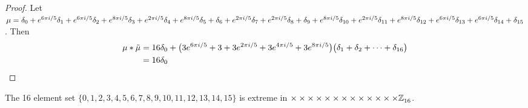  
\begin{proof}
Let  $\mu =  \delta_{0}+e^{6\pi i/5}\delta_{1}+e^{6\pi i/5}\delta_{2}+e^{8\pi i/5}\delta_{3}+e^{2\pi i/5}\delta_{4}+e^{8\pi i/5}\delta_{5}+\delta_{6}+e^{2\pi i/5}\delta_{7}+e^{2\pi i/5}\delta_{8}+\delta_{9}+e^{8\pi i/5}\delta_{10}+e^{2\pi i/5}\delta_{11}+e^{8\pi i/5}\delta_{12}+e^{6\pi i/5}\delta_{13}+e^{6\pi i/5}\delta_{14}+\delta_{15}
$.  Then 
\begin{align*} 
\mu * \tilde \mu & = 16\delta_{0}
+\big(3e^{6\pi i/5}+3+3e^{2\pi i/5}+3e^{4\pi i/5}+3e^{8\pi i/5}\big)
\big(\delta_{1}
+\delta_{2}+\cdots+\delta_{16}\big)\\&=16\delta_{0 }\qedhere
\end{align*}
\end{proof}

\begin{prop}\label{prop16inZ16}
The 16 element set $\{0,  1,  2,  3,  4,  5,  6,  7,  8,  9,  10,  11,  12,  13,  14,  15 \}$ is extreme in $ \times  \times  \times  \times  \times  \times  \times  \times  \times  \times  \times  \times  \times \texttt{$\mathbb Z_{16}^{\,}$}$. \newline \end{prop} 


 
 
